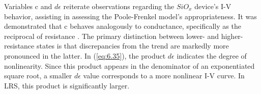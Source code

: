 


\noindent Variables c and $d\epsilon$ reiterate observations regarding the $SiO_x$  device's I-V behavior, assisting in assessing the Poole-Frenkel model's appropriateness. It was demonstrated that c behaves analogously to conductance, specifically as the reciprocal of resistance \cite{joksas2022memristive}. The primary distinction between lower- and higher-resistance states is that discrepancies from the trend are markedly more pronounced in the latter. In (\ref{eq:6.35}), the product $d\epsilon$ indicates the degree of nonlinearity. Since this product appears in the denominator of an exponentiated square root, a smaller $d\epsilon$ value corresponds to a more nonlinear I-V curve. In LRS, this product is significantly larger. \\

